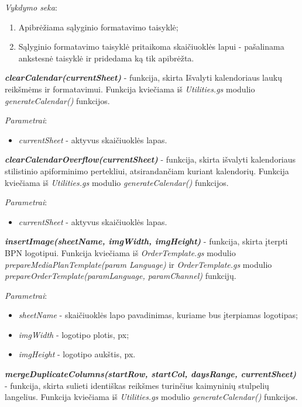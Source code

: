 \bigskip
\textit{Vykdymo seka}:
\begin{enumerate}
    \itemsep0em 
    \item Apibrėžiama sąlyginio formatavimo taisyklė;
    \item Sąlyginio formatavimo taisyklė pritaikoma skaičiuoklės lapui - pašalinama ankstesnė taisyklė ir pridedama ką tik apibrėžta.
\end{enumerate}

\bigskip
\textit{\textbf{clearCalendar(currentSheet)}} - funkcija, skirta Išvalyti kalendoriaus laukų reikšmėms ir formatavimui. Funkcija kviečiama iš \textit{Utilities.gs} modulio \textit{generateCalendar()} funkcijos.

\bigskip
\textit{Parametrai}:
\begin{itemize}
    \itemsep0em 
    \item \textit{currentSheet} - aktyvus skaičiuoklės lapas.
\end{itemize}

\bigskip
\textit{\textbf{clearCalendarOverflow(currentSheet)}} - funkcija, skirta išvalyti kalendoriaus stilistinio apiforminimo pertekliui, atsirandančiam kuriant kalendorių. Funkcija kviečiama iš \textit{Utilities.gs} modulio \textit{generateCalendar()} funkcijos.

\bigskip
\textit{Parametrai}:
\begin{itemize}
    \itemsep0em 
    \item \textit{currentSheet} - aktyvus skaičiuoklės lapas.
\end{itemize}

\bigskip
\textit{\textbf{insertImage(sheetName, imgWidth, imgHeight)}} - funkcija, skirta įterpti BPN logotipui. Funkcija kviečiama iš \textit{OrderTemplate.gs} modulio \textit{prepareMediaPlanTemplate(param Language)} ir \textit{OrderTemplate.gs} modulio \textit{prepareOrderTemplate(paramLanguage, paramChannel)} funkcijų.

\bigskip
\textit{Parametrai}:
\begin{itemize}
    \itemsep0em 
    \item \textit{sheetName} - skaičiuoklės lapo pavadinimas, kuriame bus įterpiamas logotipas;
    \item \textit{imgWidth} - logotipo plotis, px;
    \item \textit{imgHeight} - logotipo aukštis, px.
\end{itemize}

\bigskip
\textit{\textbf{mergeDuplicateColumns(startRow, startCol, daysRange, currentSheet)}} - funkcija, skirta sulieti identiškas reikšmes turinčius kaimyninių stulpelių langelius. Funkcija kviečiama iš \textit{Utilities.gs} modulio \textit{generateCalendar()} funkcijos.

